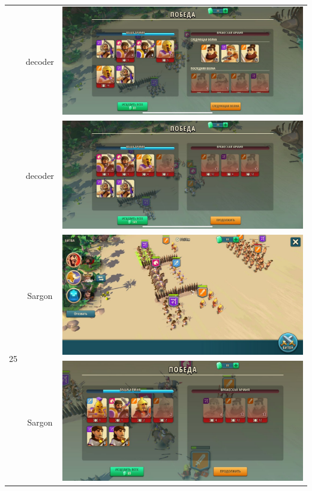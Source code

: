 \begin{longtable}{|c|c|c|}
    & decoder &
    \includegraphics[width=0.75\linewidth]{./parts/media/TreasureHunt/25/decoder/photo_2022-04-06_18-10-30.jpg} \\
    & decoder &
    \includegraphics[width=0.75\linewidth]{./parts/media/TreasureHunt/25/decoder/photo_2022-04-06_18-10-34.jpg} \\
    \hline
    \multirow{10}{*}{25} & Sargon &
    \includegraphics[width=0.75\linewidth]{./parts/media/TreasureHunt/25/sargon/photo_2022-04-07_09-58-31.jpg} \\
    & Sargon &
    \includegraphics[width=0.75\linewidth]{./parts/media/TreasureHunt/25/sargon/photo_2022-04-07_09-58-35.jpg} \\

\end{longtable}
